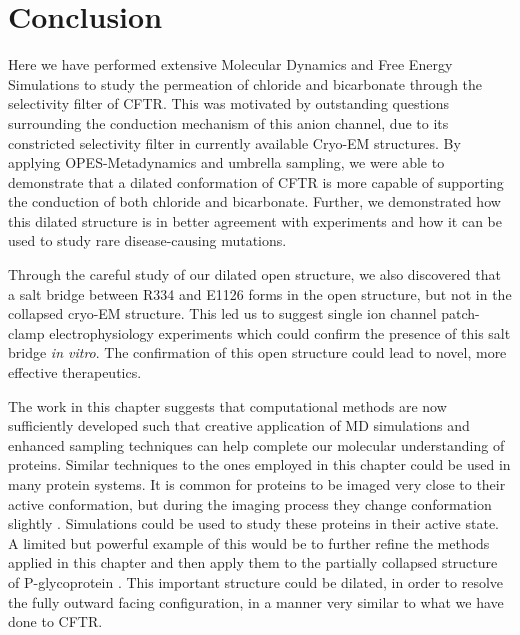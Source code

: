 
\section{Conclusion}
Here we have performed extensive Molecular Dynamics and Free Energy Simulations to study the permeation of chloride and bicarbonate through the selectivity filter of CFTR. This was motivated by outstanding questions surrounding the conduction mechanism of this anion channel, due to its constricted selectivity filter in currently available Cryo-EM structures. By applying OPES-Metadynamics and umbrella sampling, we were able to demonstrate that a dilated conformation of CFTR is more capable of supporting the conduction of both chloride and bicarbonate. Further, we demonstrated how this dilated structure is in better agreement with experiments and how it can be used to study rare disease-causing mutations.

Through the careful study of our dilated open structure, we also discovered that a salt bridge between R334 and E1126 forms in the open structure, but not in the collapsed cryo-EM structure. This led us to suggest single ion channel patch-clamp electrophysiology experiments which could confirm the presence of this salt bridge \textit{in vitro}. The confirmation of this open structure could lead to novel, more effective therapeutics.

The work in this chapter suggests that computational methods are now sufficiently developed such that creative application of MD simulations and enhanced sampling techniques can help complete our molecular understanding of proteins. Similar techniques to the ones employed in this chapter could be used in many protein systems. It is common for proteins to be imaged very close to their active conformation, but during the imaging process they change conformation slightly \cite{bock2022}. Simulations could be used to study these proteins in their active state. A limited but powerful example of this would be to further refine the methods applied in this chapter and then apply them to the partially collapsed structure of P-glycoprotein \cite{kim2018a}. This important structure could be dilated, in order to resolve the fully outward facing configuration, in a manner very similar to what we have done to CFTR.



